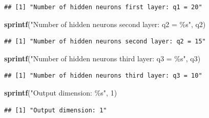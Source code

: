 \documentclass[
]{article}
\newenvironment{Shaded}{\begin{snugshade}}{\end{snugshade}}
\newcommand{\DecValTok}[1]{\textcolor[rgb]{0.00,0.00,0.81}{#1}}
\newcommand{\FunctionTok}[1]{\textcolor[rgb]{0.13,0.29,0.53}{\textbf{#1}}}
\newcommand{\NormalTok}[1]{#1}
\newcommand{\StringTok}[1]{\textcolor[rgb]{0.31,0.60,0.02}{#1}}
\begin{document}
\begin{verbatim}
## [1] "Number of hidden neurons first layer: q1 = 20"
\end{verbatim}

\begin{Shaded}
\begin{Highlighting}[]
\FunctionTok{sprintf}\NormalTok{(}\StringTok{"Number of hidden neurons second layer: q2 = \%s"}\NormalTok{, q2)}
\end{Highlighting}
\end{Shaded}

\begin{verbatim}
## [1] "Number of hidden neurons second layer: q2 = 15"
\end{verbatim}

\begin{Shaded}
\begin{Highlighting}[]
\FunctionTok{sprintf}\NormalTok{(}\StringTok{"Number of hidden neurons third layer: q3 = \%s"}\NormalTok{, q3)}
\end{Highlighting}
\end{Shaded}

\begin{verbatim}
## [1] "Number of hidden neurons third layer: q3 = 10"
\end{verbatim}

\begin{Shaded}
\begin{Highlighting}[]
\FunctionTok{sprintf}\NormalTok{(}\StringTok{"Output dimension: \%s"}\NormalTok{, }\DecValTok{1}\NormalTok{)}
\end{Highlighting}
\end{Shaded}

\begin{verbatim}
## [1] "Output dimension: 1"
\end{verbatim}
\end{document}
